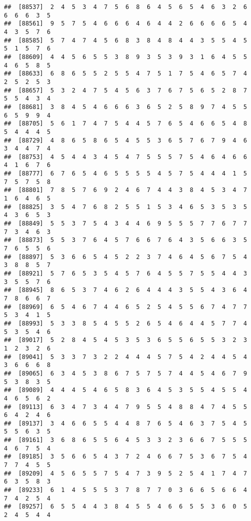 \documentclass[
]{book}
\begin{document}
\begin{verbatim}
##  [88537]  2  4  5  3  4  7  5  6  8  6  4  5  6  5  4  6  3  2  6  6  6  6  3  5
##  [88561]  9  5  7  5  4  6  6  6  4  6  4  4  2  6  6  6  6  5  4  4  3  5  7  6
##  [88585]  5  7  4  7  4  5  6  8  3  8  4  8  4  4  3  5  5  4  5  5  1  5  7  6
##  [88609]  4  4  5  6  5  5  3  8  9  3  5  3  9  3  1  6  4  5  5  4  6  5  8  5
##  [88633]  6  8  6  5  5  2  5  5  4  7  5  1  7  5  4  6  5  7  4  2  5  2  5  3
##  [88657]  5  3  2  4  7  5  4  5  6  3  7  6  7  5  6  5  2  8  7  5  5  4  3  4
##  [88681]  3  8  4  5  4  6  6  6  3  6  5  2  5  8  9  7  4  5  5  6  5  9  9  4
##  [88705]  5  6  1  7  4  7  5  4  4  5  7  6  5  4  6  6  5  4  8  5  4  4  4  5
##  [88729]  4  8  6  5  8  6  5  4  5  5  3  6  5  7  6  7  9  4  6  3  4  4  7  4
##  [88753]  4  5  4  4  3  4  5  4  7  5  5  5  7  5  4  6  4  6  6  4  1  6  7  6
##  [88777]  6  7  6  5  4  6  5  5  5  5  4  5  7  5  4  4  4  1  5  7  5  7  5  8
##  [88801]  7  8  5  7  6  9  2  4  6  7  4  4  3  8  4  5  3  4  7  1  6  4  6  5
##  [88825]  3  5  4  7  6  8  2  5  5  1  5  3  4  6  5  3  5  3  5  4  3  6  5  3
##  [88849]  5  5  3  7  5  4  3  4  4  6  9  5  5  5  7  7  6  7  7  7  3  4  6  3
##  [88873]  5  5  3  7  6  4  5  7  6  6  7  6  4  3  5  6  6  3  5  7  6  5  5  6
##  [88897]  5  3  6  6  5  4  5  2  2  3  7  4  6  4  5  6  7  5  4  3  8  8  5  7
##  [88921]  5  7  6  5  3  5  4  5  7  6  4  5  5  7  5  5  4  4  3  3  5  5  7  6
##  [88945]  8  6  5  3  7  4  6  2  6  4  4  4  3  5  5  4  3  6  4  7  8  6  6  7
##  [88969]  6  5  4  6  7  4  4  6  5  2  5  4  5  5  6  7  4  7  7  5  3  4  1  5
##  [88993]  5  3  3  8  5  4  5  5  2  6  5  4  6  4  4  5  7  7  4  5  3  5  4  6
##  [89017]  5  2  8  4  5  4  5  3  5  3  6  5  5  6  5  5  3  2  3  1  2  3  2  6
##  [89041]  5  3  3  7  3  2  2  4  4  4  5  7  5  4  2  4  4  5  4  3  6  6  6  8
##  [89065]  6  3  4  5  3  8  6  7  5  7  5  7  4  4  5  4  6  7  9  5  3  8  3  5
##  [89089]  4  4  4  5  4  6  5  8  3  6  4  5  3  5  5  4  5  5  4  4  6  5  6  2
##  [89113]  6  3  4  7  3  4  4  7  9  5  5  4  8  8  4  7  4  5  5  6  4  2  4  6
##  [89137]  3  4  6  6  5  5  4  4  8  7  6  5  4  6  3  7  5  4  5  5  5  6  3  5
##  [89161]  3  6  8  6  5  5  6  4  5  3  3  2  3  6  6  7  5  5  5  4  6  7  5  4
##  [89185]  3  5  6  6  5  4  3  7  2  4  6  6  7  5  3  6  7  5  4  7  7  4  5  5
##  [89209]  4  5  6  5  5  7  5  4  7  3  9  5  2  5  4  1  7  4  7  6  3  5  8  3
##  [89233]  6  1  4  5  5  5  3  7  8  7  7  0  3  6  6  5  6  6  4  7  4  2  5  4
##  [89257]  6  5  5  4  4  3  8  4  5  5  4  6  6  5  5  3  6  0  5  2  4  5  4  4

\end{verbatim}
\end{document}
